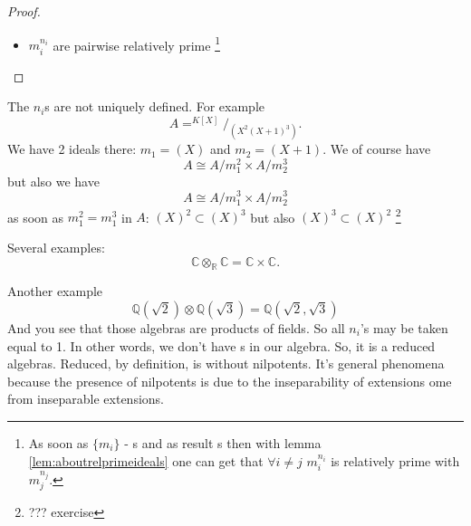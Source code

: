 \begin{theorem}
\begin{proof}
\begin{enumerate}
\begin{itemize}
{          (See also )
        }
      \item $m_i^{n_i}$ are pairwise relatively prime
        \footnote{
          As soon as $\{m_i\}$ - s and as result
          s then with lemma
          \ref{lem:aboutrelprimeideals} one can get that
          $\forall i \ne j$ $m_i^{n_i}$ is relatively prime with
          $m_j^{n_j}$.
        }
      \end{itemize}
    \end{enumerate}
  \end{proof}
  \label{thm:structurefinitekalgebra}
\end{theorem}

\begin{remark}
  The $n_i$s are not uniquely defined. For example
  \[
  A = ^{K\left[X\right]}/_{\left(X^2 \left(X+1\right)^3\right)}.
  \]
  We have 2 ideals there:
  $m_1 = (X)$ and $m_2 = (X+1)$.
  We of course have
  \[
  A \cong A/m_1^2 \times A/m_2^3
  \]
  but also we have
  \[
  A \cong A/m_1^3 \times A/m_2^3
  \]
  as soon as $m_1^2 = m_1^3$ in $A$:
  $(X)^2 \subset (X)^3$ but also
  $(X)^3 \subset (X)^2$
  \footnote{
    ??? exercise 
  }
\end{remark}

Several examples:
\[
\mathbb{C} \otimes_\mathbb{R} \mathbb{C} =
\mathbb{C} \times \mathbb{C}.
\]

Another example
\[
\mathbb{Q}\left(\sqrt{2}\right)
\otimes
\mathbb{Q}\left(\sqrt{3}\right) =
\mathbb{Q}\left(\sqrt{2}, \sqrt{3}\right)
\]
And you see that those algebras are products of fields.
So all $n_i$'s may be taken equal to 1. In other words, we don't have
s in our algebra. So, it is a reduced
algebras. Reduced, by definition, is without nilpotents.     
It's general phenomena because the presence of nilpotents is due to the
inseparability of extensions ome from inseparable extensions.  
